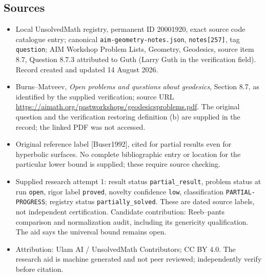 \documentclass[11pt]{article}
\begin{document}
\subsection{Sources}
\begin{itemize}
\item Local UnsolvedMath registry, permanent ID 20001920, exact source code catalogue entry; canonical \texttt{aim-geometry-notes.json}, \texttt{notes[257]}, tag \texttt{question}; AIM Workshop Problem Lists, Geometry, Geodesics, source item 8.7, Question 8.7.3 attributed to Guth (Larry Guth in the verification field). Record created and updated 14 August 2026.
\item Burns--Matveev, \emph{Open problems and questions about geodesics}, Section 8.7, as identified by the supplied verification; source URL \url{https://aimath.org/pastworkshops/geodesicsproblems.pdf}. The original question and the verification restoring definition (b) are supplied in the record; the linked PDF was not accessed.
\item Original reference label [Buser1992], cited for partial results even for hyperbolic surfaces. No complete bibliographic entry or location for the particular lower bound is supplied; these require source checking.
\item Supplied research attempt 1: result status \texttt{partial\_result}, problem status at run \texttt{open}, rigor label \texttt{proved}, novelty confidence \texttt{low}, classification \texttt{PARTIAL-PROGRESS}; registry status \texttt{partially\_solved}. These are dated source labels, not independent certification. Candidate contribution: Reeb--pants comparison and normalization audit, including its genericity qualification. The aid says the universal bound remains open.
\item Attribution: Ulam AI / UnsolvedMath Contributors; CC BY 4.0. The research aid is machine generated and not peer reviewed; independently verify before citation.
\end{itemize}
\end{document}
